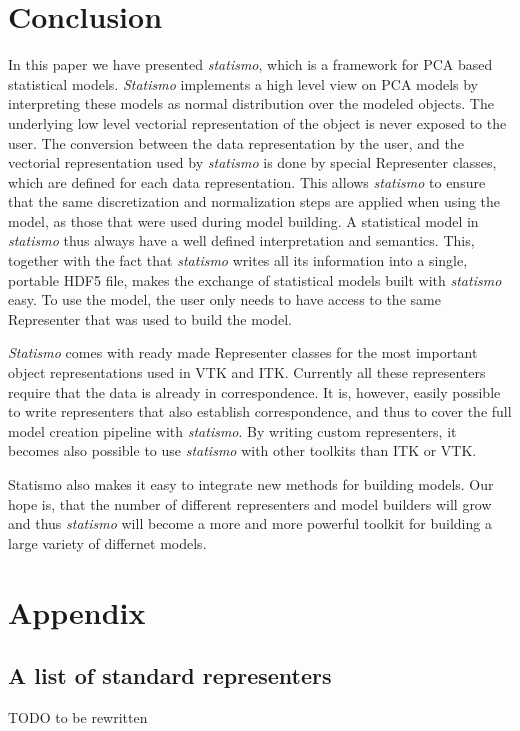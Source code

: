 \documentclass{InsightArticle}
\newcommand{\statismo}{\emph{statismo}\xspace}
\newcommand{\Statismo}{\emph{Statismo}\xspace}
\begin{document}
\section{Conclusion}
In this paper we have presented \statismo, which is a framework for
PCA based statistical models.  \Statismo implements a high level view
on PCA models by interpreting these models as normal distribution over
the modeled objects. The underlying low level vectorial representation
of the object is never exposed to the user.  The conversion between
the data representation by the user, and the vectorial representation
used by \statismo is done by special Representer classes, which are
defined for each data representation. This allows \statismo to ensure
that the same discretization and normalization steps are applied when
using the model, as those that were used during model building.  A
statistical model in \statismo thus always have a well defined
interpretation and semantics.  This, together with the fact that
\statismo writes all its information into a single, portable HDF5
file, makes the exchange of statistical models built with \statismo
easy. To use the model, the user only needs to have access to the same Representer that was used to build the model. 

\Statismo comes with ready made Representer classes for the most important object representations used in VTK and ITK. 
Currently all these representers require that the data is already in correspondence. It is, however, easily possible to 
write representers that also establish correspondence, and thus to cover the full model creation pipeline with \statismo.
By writing custom representers, it becomes also possible to use \statismo with other toolkits than ITK or VTK. 

Statismo also makes it easy to integrate new methods for building models. Our hope is, that the number of different representers
and model builders will grow and thus \statismo will become a more and more powerful toolkit for building a large variety of differnet 
models.




\appendix

\section{Appendix}
\subsection{A list of standard representers}\label{app:representers}
TODO to be rewritten
\end{document}
